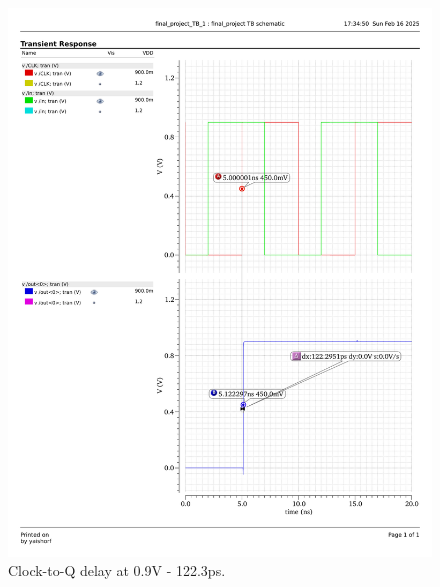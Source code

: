 \documentclass[a4paper,12pt]{article}
\begin{document}
\begin{figure}[H]
    \centering
    \begin{minipage}{0.49\textwidth}
        \centering
        \includegraphics[width=\textwidth]{graphs/CQ_0.9_122.3p.pdf}
        \caption{Clock-to-Q delay at 0.9V - 122.3ps.}
    \end{minipage}
    \hfill
    \begin{minipage}{0.49\textwidth}
        \centering

\end{minipage}
\end{figure}
\end{document}
